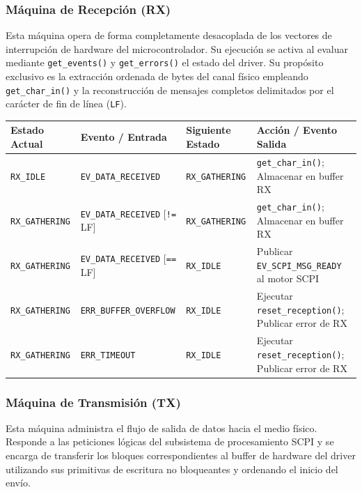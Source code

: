 \subsubsection{Máquina de Recepción (RX)}
\label{subsubsec:fsm-recepcion-nueva}

Esta máquina opera de forma completamente desacoplada de los vectores de interrupción de hardware del microcontrolador. Su ejecución se activa al evaluar mediante \texttt{get\_events()} y \texttt{get\_errors()} el estado del driver. Su propósito exclusivo es la extracción ordenada de bytes del canal físico empleando \texttt{get\_char\_in()} y la reconstrucción de mensajes completos delimitados por el carácter de fin de línea (\texttt{LF}).

\begin{center}
\small
\begin{tabular}{llll}
\toprule
\textbf{Estado Actual} & \textbf{Evento / Entrada} & \textbf{Siguiente Estado} & \textbf{Acción / Evento Salida} \\
\midrule
\texttt{RX\_IDLE} & \texttt{EV\_DATA\_RECEIVED} & \texttt{RX\_GATHERING} & \texttt{get\_char\_in()}; Almacenar en buffer RX \\
\texttt{RX\_GATHERING} & \texttt{EV\_DATA\_RECEIVED} [\texttt{!=} LF] & \texttt{RX\_GATHERING} & \texttt{get\_char\_in()}; Almacenar en buffer RX \\
\texttt{RX\_GATHERING} & \texttt{EV\_DATA\_RECEIVED} [\texttt{==} LF] & \texttt{RX\_IDLE} & Publicar \texttt{EV\_SCPI\_MSG\_READY} al motor SCPI \\
\texttt{RX\_GATHERING} & \texttt{ERR\_BUFFER\_OVERFLOW} & \texttt{RX\_IDLE} & Ejecutar \texttt{reset\_reception()}; Publicar error de RX \\
\texttt{RX\_GATHERING} & \texttt{ERR\_TIMEOUT} & \texttt{RX\_IDLE} & Ejecutar \texttt{reset\_reception()}; Publicar error de RX \\
\bottomrule
\end{tabular}
\end{center}

\subsubsection{Máquina de Transmisión (TX)}
\label{subsubsec:fsm-transmision-nueva}

Esta máquina administra el flujo de salida de datos hacia el medio físico. Responde a las peticiones lógicas del subsistema de procesamiento SCPI y se encarga de transferir los bloques correspondientes al buffer de hardware del driver utilizando sus primitivas de escritura no bloqueantes y ordenando el inicio del envío.

